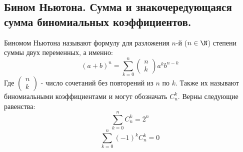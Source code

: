 \subsection{Бином Ньютона. Сумма и знакочередующаяся сумма биномиальных коэффициентов.}
Биномом Ньютона называют формулу для разложения $n$-й ($n \in \N$) степени суммы двух переменных, а именно:
$$(a + b)^n = \sum_{k=0}^{n} \begin{pmatrix}n\\k\end{pmatrix}a^{k}b^{n-k}$$
Где $\begin{pmatrix}n\\k\end{pmatrix}$ - число сочетаний без повторений из $n$ по $k$. Также их называют биномиальными коэффициентами и могут обозначать $C_n^k$. Верны следующие равенства:
$$\sum_{k=0}^{n} C_n^k = 2^n$$
$$\sum_{k=0}^{n} (-1)^kC_n^k = 0$$
